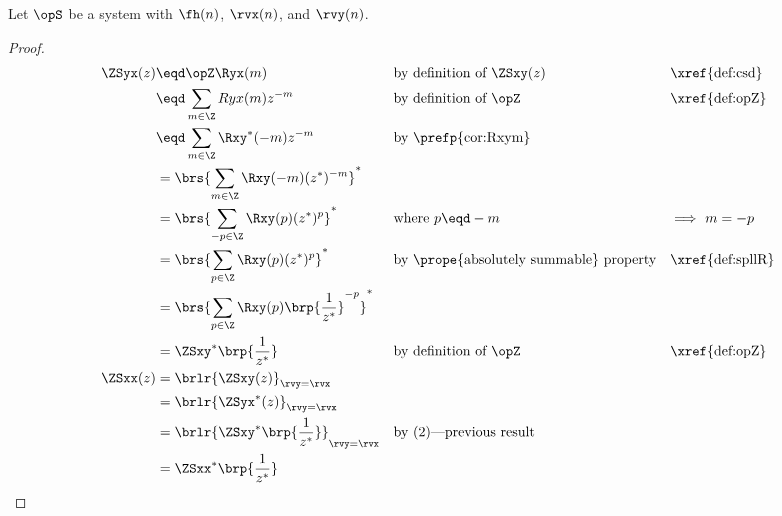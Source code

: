 \begin{theorem}
\label{thm:ZSxy_sym}
Let $\opS$ be a system with  $\fh(n)$,
 $\rvx(n)$, and  $\rvy(n)$.
\end{theorem}
\begin{proof}
\begin{align*}
  \ZSyx(z)
     &\eqd \opZ \Ryx(m)
    && \text{by definition of $\ZSxy(z)$}
    && \text{\xref{def:csd}}
  \\&\eqd \sum_{m\in\Z} Ryx(m) z^{-m}
    && \text{by definition of $\opZ$}
    && \text{\xref{def:opZ}}
  \\&\eqd \sum_{m\in\Z} \Rxy^\ast(-m) z^{-m}
    && \text{by \prefp{cor:Rxym}}
  \\&= \brs{\sum_{m\in\Z} \Rxy(-m) (z^\ast)^{-m}}^\ast
  \\&= \brs{\sum_{-p\in\Z} \Rxy(p) (z^\ast)^{p}}^\ast
    && \text{where $p\eqd -m$}
    && \text{$\implies$ $m=-p$}
  \\&= \brs{\sum_{p\in\Z} \Rxy(p) (z^\ast)^{p}}^\ast
    && \text{by \prope{absolutely summable} property}
    && \text{\xref{def:spllR}}
  \\&= \brs{\sum_{p\in\Z} \Rxy(p) \brp{\frac{1}{z^\ast}}^{-p}}^\ast
  \\&= \ZSxy^\ast\brp{\frac{1}{z^\ast}}
    && \text{by definition of $\opZ$}
    && \text{\xref{def:opZ}}
  \\
  \ZSxx(z)
    &= \brlr{\ZSxy(z)}_{\rvy=\rvx}
  \\&= \brlr{\ZSyx^\ast(z)}_{\rvy=\rvx}
  \\&= \brlr{\ZSxy^\ast\brp{\frac{1}{z^\ast}}}_{\rvy=\rvx}
    && \text{by (2)---previous result}
  \\&= \ZSxx^\ast\brp{\frac{1}{z^\ast}}
\end{align*}
\end{proof}

